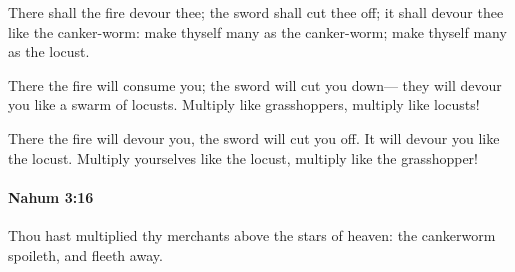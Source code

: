 			\begin{versebox}
					\item[BHS] 
					\item[LXX] 
					\item[ASV] There shall the fire devour thee; the sword shall cut thee off; it shall devour thee like the canker-worm: make thyself many as the canker-worm; make thyself many as the locust.
					\item[NIV] There the fire will consume you; the sword will cut you down— they will devour you like a swarm of locusts. Multiply like grasshoppers, multiply like locusts!
					\item[NRSV] There the fire will devour you, the sword will cut you off. It will devour you like the locust. Multiply yourselves like the locust, multiply like the grasshopper!
			\end{versebox}

		\paragraph{Nahum 3:16} %
			\label{NAHUM-3-16}

			Thou hast multiplied thy merchants above the stars of heaven: the cankerworm spoileth, and fleeth away.

